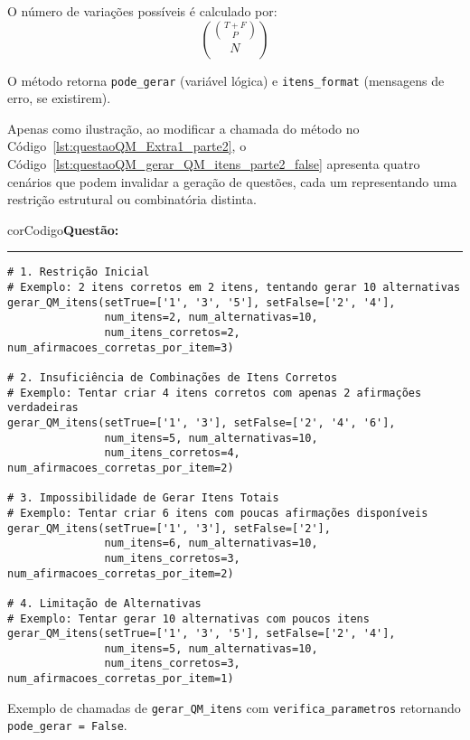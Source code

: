 O número de variações possíveis é calculado por:
\begin{equation}
    \binom{\binom{T+F}{P}}{N}
\end{equation}

O método retorna \verb|pode_gerar| (variável lógica) e \verb|itens_format| (mensagens de erro, se existirem).

Apenas como ilustração, ao modificar a chamada do método no Código~\ref{lst:questaoQM_Extra1_parte2}, o Código~\ref{lst:questaoQM_gerar_QM_itens_parte2_false} apresenta quatro cenários que podem invalidar a geração de questões, cada um representando uma restrição estrutural ou combinatória distinta.

\begin{listing}[!ht]
    \begin{myboxCode}{corCodigo}{\textbf{Questão: }}\vspace{3mm}
    \hrule
    \begin{verbatim}
# 1. Restrição Inicial
# Exemplo: 2 itens corretos em 2 itens, tentando gerar 10 alternativas
gerar_QM_itens(setTrue=['1', '3', '5'], setFalse=['2', '4'], 
               num_itens=2, num_alternativas=10, 
               num_itens_corretos=2, num_afirmacoes_corretas_por_item=3)

# 2. Insuficiência de Combinações de Itens Corretos
# Exemplo: Tentar criar 4 itens corretos com apenas 2 afirmações verdadeiras
gerar_QM_itens(setTrue=['1', '3'], setFalse=['2', '4', '6'], 
               num_itens=5, num_alternativas=10, 
               num_itens_corretos=4, num_afirmacoes_corretas_por_item=2)

# 3. Impossibilidade de Gerar Itens Totais
# Exemplo: Tentar criar 6 itens com poucas afirmações disponíveis
gerar_QM_itens(setTrue=['1', '3'], setFalse=['2'], 
               num_itens=6, num_alternativas=10, 
               num_itens_corretos=3, num_afirmacoes_corretas_por_item=2)

# 4. Limitação de Alternativas
# Exemplo: Tentar gerar 10 alternativas com poucos itens
gerar_QM_itens(setTrue=['1', '3', '5'], setFalse=['2', '4'], 
               num_itens=5, num_alternativas=10, 
               num_itens_corretos=3, num_afirmacoes_corretas_por_item=1)
\end{verbatim}
\end{myboxCode}
\caption{Exemplo de chamadas de \texttt{gerar\_QM\_itens} com \texttt{verifica\_parametros} retornando \texttt{pode\_gerar = False}.}
\label{lst:questaoQM_gerar_QM_itens_parte2_false}
\end{listing}

